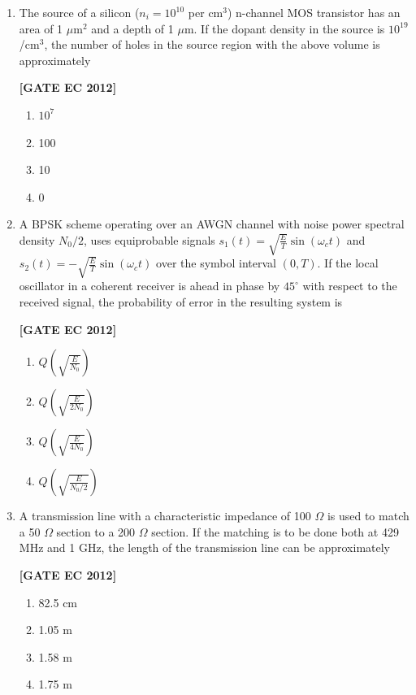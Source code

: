 \documentclass[12pt]{article}
\begin{document}
\begin{enumerate}[leftmargin=1.0em, label=\textbf{Q.\arabic*.}, itemsep=2em]
\begin{enumerate}[leftmargin=2.5em, label=\textbf{Q.\arabic*.}, itemsep=2em, start=26]
\item The source of a silicon ($n_i = 10^{10}$ per cm$^3$) n-channel MOS transistor has an area of 1 $\mu$m$^2$ and a depth of 1 $\mu$m. If the dopant density in the source is $10^{19}$/cm$^3$, the number of holes in the source region with the above volume is approximately

\noindent \textbf{[GATE EC 2012]}
\begin{multicols}{2}
    \begin{enumerate}
        \item $10^7$
        \item 100
        \item 10
        \item 0
    \end{enumerate}
\end{multicols}

\item A BPSK scheme operating over an AWGN channel with noise power spectral density $N_0/2$, uses equiprobable signals $s_1(t) = \sqrt{\tfrac{E}{T}} \sin(\omega_c t)$ and $s_2(t) = -\sqrt{\tfrac{E}{T}} \sin(\omega_c t)$ over the symbol interval $(0,T)$. If the local oscillator in a coherent receiver is ahead in phase by $45^\circ$ with respect to the received signal, the probability of error in the resulting system is

\noindent \textbf{[GATE EC 2012]}
\begin{multicols}{2}
    \begin{enumerate}
        \item $Q\!\left(\sqrt{\tfrac{E}{N_0}}\right)$
        \item $Q\!\left(\sqrt{\tfrac{E}{2N_0}}\right)$
        \item $Q\!\left(\sqrt{\tfrac{E}{4N_0}}\right)$
        \item $Q\!\left(\sqrt{\tfrac{E}{N_0/2}}\right)$
    \end{enumerate}
\end{multicols}

\item A transmission line with a characteristic impedance of 100 $\Omega$ is used to match a 50 $\Omega$ section to a 200 $\Omega$ section. If the matching is to be done both at 429 MHz and 1 GHz, the length of the transmission line can be approximately

\noindent \textbf{[GATE EC 2012]}
\begin{multicols}{2}
    \begin{enumerate}
        \item 82.5 cm
        \item 1.05 m
        \item 1.58 m
        \item 1.75 m
    \end{enumerate}
\end{multicols}


\end{enumerate}
\end{enumerate}
\end{document}
